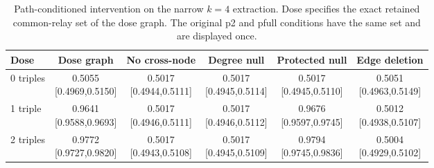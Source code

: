 \begin{table}[H]\centering
\caption{Path-conditioned intervention on the narrow $k=4$ extraction. Dose specifies the exact retained common-relay set of the dose graph. The original p2 and pfull conditions have the same set and are displayed once.}\label{tab:path-full}
\small\setlength{\tabcolsep}{4pt}
\begin{tabular}{lccccc}\toprule
Dose & Dose graph & No cross-node & Degree null & Protected null & Edge deletion \\ \midrule
0 triples & \shortstack{0.5055\\{}[0.4969,0.5150]} & \shortstack{0.5017\\{}[0.4944,0.5111]} & \shortstack{0.5017\\{}[0.4945,0.5114]} & \shortstack{0.5017\\{}[0.4945,0.5110]} & \shortstack{0.5051\\{}[0.4963,0.5149]} \\[3pt]
1 triple & \shortstack{0.9641\\{}[0.9588,0.9693]} & \shortstack{0.5017\\{}[0.4946,0.5111]} & \shortstack{0.5017\\{}[0.4946,0.5112]} & \shortstack{0.9676\\{}[0.9597,0.9745]} & \shortstack{0.5012\\{}[0.4938,0.5107]} \\[3pt]
2 triples & \shortstack{0.9772\\{}[0.9727,0.9820]} & \shortstack{0.5017\\{}[0.4943,0.5108]} & \shortstack{0.5017\\{}[0.4945,0.5109]} & \shortstack{0.9794\\{}[0.9745,0.9836]} & \shortstack{0.5004\\{}[0.4929,0.5102]} \\[3pt]
\bottomrule\end{tabular}
\end{table}
